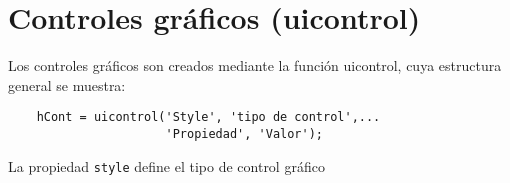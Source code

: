 \section{Controles gráficos (uicontrol)}

Los controles gráficos son creados mediante la función uicontrol, cuya estructura general se muestra:

\begin{verbatim}
	hCont = uicontrol('Style', 'tipo de control',...
	                  'Propiedad', 'Valor');
\end{verbatim}

La propiedad \texttt{style} define el tipo de control gráfico